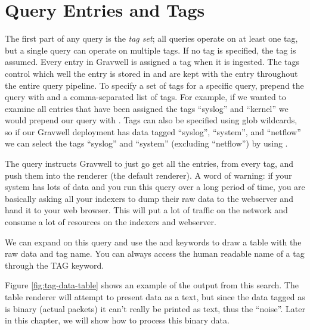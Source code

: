 \section{Query Entries and Tags}
The first part of any query is the \emph{tag set}; all queries operate on at
least one tag, but a single query can operate on multiple tags. If no
tag is specified, the  tag is assumed. Every entry in
Gravwell is assigned a tag when it is ingested. The tags control which
well the entry is stored in and are kept with the entry throughout the
entire query pipeline. To specify a set of tags for a specific query,
prepend the query with  and a comma-separated list of tags. For
example, if we wanted to examine all entries that have been assigned the
tags ``syslog'' and ``kernel'' we would prepend our query with
. Tags can also be specified using glob wildcards,
so if our Gravwell deployment has data tagged ``syslog'', ``system'', and
``netflow'' we can select the tags ``syslog'' and ``system'' (excluding ``netflow'') by using
. 

The query  instructs Gravwell to just go get all the entries,
from every tag, and push them into the  renderer (the default renderer).
A word of warning: if your system
has lots of data and you run this query over a long period of time, you are
basically asking all your indexers to dump their raw data to the
webserver and hand it to your web browser. This will put a lot of traffic on
the network and consume a lot of resources on the indexers and webserver.

We can expand on this query and use the  and  keywords to draw a
table with the raw data and tag name. You can always access the human
readable name of a tag through the TAG keyword.


Figure \ref{fig:tag-data-table} shows an example of the output from this search. The table renderer will attempt to present data as a text, but since
the data tagged as  is binary (actual packets) it can't really
be printed as text, thus the ``noise''. Later in this chapter, we will show how to
process this binary data.

